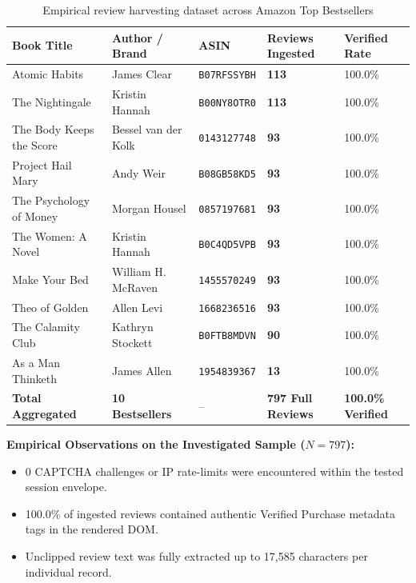 \documentclass[11pt,a4paper]{article}
\begin{document}
\begin{table}[h!]
\centering
\small
\begin{tabular}{lllll}
\toprule
\textbf{Book Title} & \textbf{Author / Brand} & \textbf{ASIN} & \textbf{Reviews Ingested} & \textbf{Verified Rate} \\ \midrule
Atomic Habits & James Clear & \texttt{B07RFSSYBH} & \textbf{113} & 100.0\% \\
The Nightingale & Kristin Hannah & \texttt{B00NY8OTR0} & \textbf{113} & 100.0\% \\
The Body Keeps the Score & Bessel van der Kolk & \texttt{0143127748} & \textbf{93} & 100.0\% \\
Project Hail Mary & Andy Weir & \texttt{B08GB58KD5} & \textbf{93} & 100.0\% \\
The Psychology of Money & Morgan Housel & \texttt{0857197681} & \textbf{93} & 100.0\% \\
The Women: A Novel & Kristin Hannah & \texttt{B0C4QD5VPB} & \textbf{93} & 100.0\% \\
Make Your Bed & William H. McRaven & \texttt{1455570249} & \textbf{93} & 100.0\% \\
Theo of Golden & Allen Levi & \texttt{1668236516} & \textbf{93} & 100.0\% \\
The Calamity Club & Kathryn Stockett & \texttt{B0FTB8MDVN} & \textbf{90} & 100.0\% \\
As a Man Thinketh & James Allen & \texttt{1954839367} & \textbf{13} & 100.0\% \\ \midrule
\textbf{Total Aggregated} & \textbf{10 Bestsellers} & -- & \textbf{797 Full Reviews} & \textbf{100.0\% Verified} \\ \bottomrule
\end{tabular}
\caption{Empirical review harvesting dataset across Amazon Top Bestsellers}
\end{table}

\noindent \textbf{Empirical Observations on the Investigated Sample ($N=797$):}
\begin{itemize}
    \item 0 CAPTCHA challenges or IP rate-limits were encountered within the tested session envelope.
    \item 100.0\% of ingested reviews contained authentic Verified Purchase metadata tags in the rendered DOM.
    \item Unclipped review text was fully extracted up to 17,585 characters per individual record.
\end{itemize}
\end{document}
